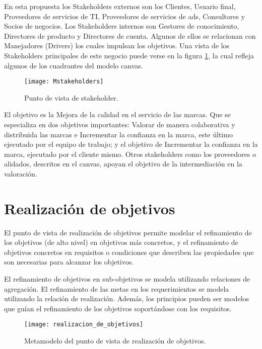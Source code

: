 En esta propuesta los Stakeholders externos son los Clientes, Usuario final, Proveedores de servicios de TI, Proveedores de servicios de ads, Consultores y Socios de negocios. Los Stakeholders internos son Gestores de conocimiento, Directores de producto y Directores de cuenta. Algunos de ellos se relacionan con Manejadores (Drivers) los cuales impulsan los objetivos. Una vista de los Stakeholders principales de este negocio puede verse en la figura \ref{diagramastakeholders}, la cual refleja algunos de los cuadrantes del modelo canvas.

\begin{figure}[H]
\centering
\texttt{[image: Mstakeholders]}
\caption{Punto de vista de stakeholder.}
\label{diagramastakeholders}
\end{figure}

El objetivo es la Mejora de la calidad en el servicio de las marcas. Que se especializa en dos objetivos importantes: Valorar de manera colaborativa y distribuida las marcas e Incrementar la confianza en la marca, este último ejecutado por el equipo de trabajo; y el objetivo de Incrementar la confianza en la marca, ejecutado por el cliente mismo. Otros stakeholders como los proveedores o alidados, descritos en el canvas, apoyan el objetivo de la intermediación en la valoración. 

\section{Realización de objetivos}

El punto de vista de realización de objetivos permite modelar el refinamiento de los objetivos (de alto nivel) en objetivos más concretos, y el refinamiento de objetivos concretos en requisitos o condiciones que describen las propiedades que son necesarias para alcanzar los objetivos. 

El refinamiento de objetivos en sub-objetivos se modela utilizando relaciones de agregación. El refinamiento de las metas en los requerimientos se modela utilizando la relación de realización. Además, los principios pueden ser modelos que guían el refinamiento de los objetivos soportándose con los requisitos.

\begin{figure}[H]
\centering
\texttt{[image: realizacion\_de\_objetivos]}
\caption{Metamodelo del punto de vista de realización de objetivos.}
\end{figure}


